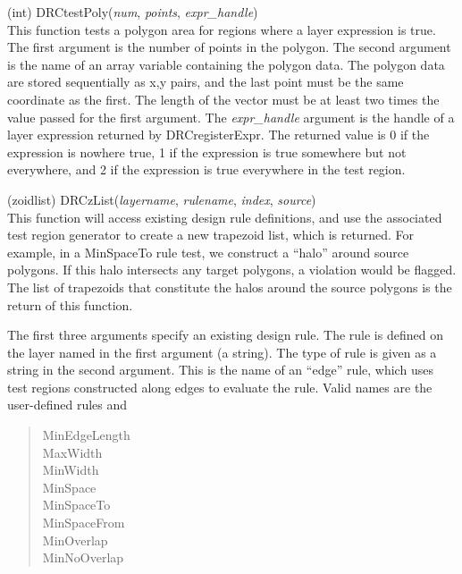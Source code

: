 \begin{description}
\item{(int) \vt DRCtestPoly({\it num\/}, {\it points\/},
 {\it expr\_handle\/})}\\
This function tests a polygon area for regions where a layer
expression is true.  The first argument is the number of points in the
polygon.  The second argument is the name of an array variable
containing the polygon data.  The polygon data are stored sequentially
as x,y pairs, and the last point must be the same coordinate as the
first.  The length of the vector must be at least two times the value
passed for the first argument.  The {\it expr\_handle\/} argument is
the handle of a layer expression returned by {\vt DRCregisterExpr}. 
The returned value is 0 if the expression is nowhere true, 1 if the
expression is true somewhere but not everywhere, and 2 if the
expression is true everywhere in the test region.

\item{(zoidlist) \vt DRCzList({\it layername\/}, {\it rulename\/},
 {\it index\/}, {\it source\/})}\\
This function will access existing design rule definitions, and use
the associated test region generator to create a new trapezoid list,
which is returned.  For example, in a {\vt MinSpaceTo} rule test, we
construct a ``halo'' around source polygons.  If this halo intersects
any target polygons, a violation would be flagged.  The list of
trapezoids that constitute the halos around the source polygons is the
return of this function.

The first three arguments specify an existing design rule.  The rule
is defined on the layer named in the first argument (a string).  The
type of rule is given as a string in the second argument.  This is the
name of an ``edge'' rule, which uses test regions constructed along
edges to evaluate the rule.  Valid names are the user-defined rules
and

\begin{quote} \vt
MinEdgeLength\\
MaxWidth\\
MinWidth\\
MinSpace\\
MinSpaceTo\\
MinSpaceFrom\\
MinOverlap\\
MinNoOverlap
\end{quote}


\end{description}
